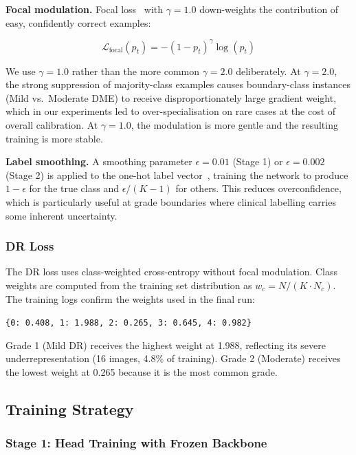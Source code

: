 \documentclass[12pt,a4paper]{article}
\begin{document}
\textbf{Focal modulation.} Focal loss~\cite{Lin2017FocalLoss} with $\gamma = 1.0$ down-weights the contribution of easy, confidently correct examples:

\begin{equation}
\mathcal{L}_{\text{focal}}(p_t) = -(1 - p_t)^\gamma \log(p_t)
\end{equation}

We use $\gamma = 1.0$ rather than the more common $\gamma = 2.0$ deliberately. At $\gamma = 2.0$, the strong suppression of majority-class examples causes boundary-class instances (Mild vs.\ Moderate DME) to receive disproportionately large gradient weight, which in our experiments led to over-specialisation on rare cases at the cost of overall calibration. At $\gamma = 1.0$, the modulation is more gentle and the resulting training is more stable.

\textbf{Label smoothing.} A smoothing parameter $\epsilon = 0.01$ (Stage 1) or $\epsilon = 0.002$ (Stage 2) is applied to the one-hot label vector~\cite{Szegedy2017}, training the network to produce $1 - \epsilon$ for the true class and $\epsilon / (K-1)$ for others. This reduces overconfidence, which is particularly useful at grade boundaries where clinical labelling carries some inherent uncertainty.

\subsubsection{DR Loss}

The DR loss uses class-weighted cross-entropy without focal modulation. Class weights are computed from the training set distribution as $w_c = N / (K \cdot N_c)$. The training logs confirm the weights used in the final run:

\begin{center}
\texttt{\{0: 0.408, 1: 1.988, 2: 0.265, 3: 0.645, 4: 0.982\}}
\end{center}

Grade 1 (Mild DR) receives the highest weight at 1.988, reflecting its severe underrepresentation (16 images, 4.8\% of training). Grade 2 (Moderate) receives the lowest weight at 0.265 because it is the most common grade.

\subsection{Training Strategy}

\subsubsection{Stage 1: Head Training with Frozen Backbone}
\end{document}
